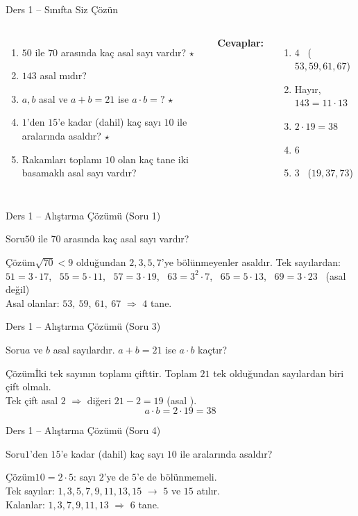 \documentclass[aspectratio=169,11pt]{beamer}
\newcommand{\soru}[3]{%
\begin{frame}{#1}
  \begin{block}{Soru}\large #2\end{block}
  \pause
  \begin{exampleblock}{Çözüm}\large #3\end{exampleblock}
\end{frame}}
\begin{document}
\begin{frame}{Ders 1 -- Sınıfta Siz Çözün}
\begin{columns}[t]
\begin{enumerate}
\item \(50\) ile \(70\) arasında kaç asal sayı vardır? \(\star\)
\item \(143\) asal mıdır?
\item \(a,b\) asal ve \(a+b=21\) ise \(a\cdot b=?\) \(\star\)
\item \(1\)'den \(15\)'e kadar (dahil) kaç sayı \(10\) ile aralarında asaldır? \(\star\)
\item Rakamları toplamı \(10\) olan kaç tane iki basamaklı asal sayı vardır?
\end{enumerate}
\pause
\textbf{Cevaplar:}
\begin{enumerate}
\item \(4\) \ (\(53,59,61,67\))
\item Hayır, \(143=11\cdot 13\)
\item \(2\cdot 19=38\)
\item \(6\)
\item \(3\) \ (\(19,37,73\))
\end{enumerate}
\end{columns}
\vspace{4pt}{\footnotesize \(\star\) işaretli soruların adım adım çözümü sonraki slaytlardadır.}
\end{frame}

\soru{Ders 1 -- Alıştırma Çözümü (Soru 1)}
{\(50\) ile \(70\) arasında kaç asal sayı vardır?}
{\(\sqrt{70}<9\) olduğundan \(2,3,5,7\)'ye bölünmeyenler asaldır. Tek sayılardan:\\[3pt]
\(51=3\cdot17\), \ \(55=5\cdot 11\), \ \(57=3\cdot 19\), \ \(63=3^2\cdot 7\), \ \(65=5\cdot 13\), \ \(69=3\cdot 23\) \ (asal değil)\\[3pt]
Asal olanlar: \(53,\ 59,\ 61,\ 67\) \(\Rightarrow\) \(4\) tane.}

\soru{Ders 1 -- Alıştırma Çözümü (Soru 3)}
{\(a\) ve \(b\) asal sayılardır. \(a+b=21\) ise \(a\cdot b\) kaçtır?}
{İki tek sayının toplamı çifttir. Toplam \(21\) tek olduğundan sayılardan biri çift olmalı.\\[3pt]
Tek çift asal \(2\) \(\Rightarrow\) diğeri \(21-2=19\) (asal \checkmark).
\[a\cdot b=2\cdot 19=38\]}

\soru{Ders 1 -- Alıştırma Çözümü (Soru 4)}
{\(1\)'den \(15\)'e kadar (dahil) kaç sayı \(10\) ile aralarında asaldır?}
{\(10=2\cdot 5\): sayı \(2\)'ye de \(5\)'e de bölünmemeli.\\[3pt]
Tek sayılar: \(1,3,5,7,9,11,13,15\) \quad \(\rightarrow\) \(5\) ve \(15\) atılır.\\[3pt]
Kalanlar: \(1,3,7,9,11,13\) \(\Rightarrow\) \(6\) tane.}
\end{document}
